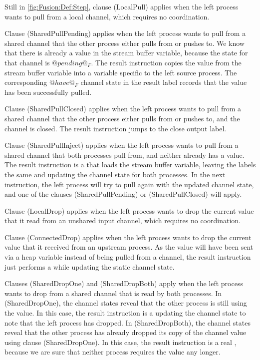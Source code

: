 Still in \cref{fig:Fusion:Def:Step}, clause (LocalPull) applies when the left process wants to pull from a local channel, which requires no coordination.

Clause (SharedPullPending) applies when the left process wants to pull from a shared channel that the other process either pulls from or pushes to.
We know that there is already a value in the stream buffer variable, because the state for that channel is $@pending@_F$.
The result instruction copies the value from the stream buffer variable into a variable specific to the left source process.
The corresponding $@have@_F$ channel state in the result label records that the value has been successfully pulled.

Clause (SharedPullClosed) applies when the left process wants to pull from a shared channel that the other process either pulls from or pushes to, and the channel is closed.
The result instruction jumps to the close output label.

Clause (SharedPullInject) applies when the left process wants to pull from a shared channel that both processes pull from, and neither already has a value.
The result instruction is a \lstiproc@pull@ that loads the stream buffer variable, leaving the labels the same and updating the channel state for both processes.
In the next instruction, the left process will try to pull again with the updated channel state, and one of the clauses (SharedPullPending) or (SharedPullClosed) will apply.

Clause (LocalDrop) applies when the left process wants to drop the current value that it read from an unshared input channel, which requires no coordination.

Clause (ConnectedDrop) applies when the left process wants to drop the current value that it received from an upstream process. As the value will have been sent via a heap variable instead of being pulled from a channel, the result instruction just performs a \lstiproc@jump@ while updating the static channel state.

Clauses (SharedDropOne) and (SharedDropBoth) apply when the left process wants to drop from a shared channel that is read by both processes. In (SharedDropOne), the channel states reveal that the other process is still using the value. In this case, the result instruction is a \lstiproc@jump@ updating the channel state to note that the left process has dropped. In (SharedDropBoth), the channel states reveal that the other process has already dropped its copy of the channel value using clause (SharedDropOne). In this case, the result instruction is a real \lstiproc@drop@, because we are sure that neither process requires the value any longer.

